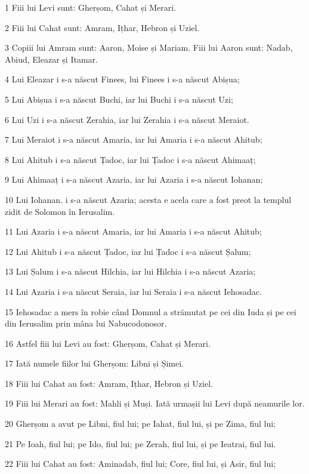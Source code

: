 \par 1 Fiii lui Levi sunt: Gherșom, Cahat și Merari.
\par 2 Fiii lui Cahat sunt: Amram, Ițhar, Hebron și Uziel.
\par 3 Copiii lui Amram sunt: Aaron, Moise și Mariam. Fiii lui Aaron sunt: Nadab, Abiud, Eleazar și Itamar.
\par 4 Lui Eleazar i s-a născut Finees, lui Finees i s-a născut Abișua;
\par 5 Lui Abișua i s-a născut Buchi, iar lui Buchi i s-a născut Uzi;
\par 6 Lui Uzi i s-a născut Zerahia, iar lui Zerahia i s-a născut Meraiot.
\par 7 Lui Meraiot i s-a născut Amaria, iar lui Amaria i s-a născut Ahitub;
\par 8 Lui Ahitub i s-a născut Țadoc, iar lui Țadoc i s-a născut Ahimaaț;
\par 9 Lui Ahimaaț i s-a născut Azaria, iar lui Azaria i s-a născut Iohanan;
\par 10 Lui Iohanan. i s-a născut Azaria; acesta e acela care a fost preot la templul zidit de Solomon în Ierusalim.
\par 11 Lui Azaria i s-a născut Amaria, iar lui Amaria i s-a născut Ahitub;
\par 12 Lui Ahitub i s-a născut Țadoc, iar lui Țadoc i s-a născut Șalum;
\par 13 Lui Șalum i s-a născut Hilchia, iar lui Hilchia i s-a născut Azaria;
\par 14 Lui Azaria i s-a născut Seraia, iar lui Seraia i s-a născut Iehosadac.
\par 15 Iehosadac a mers în robie când Domnul a strămutat pe cei din Iuda și pe cei din Ierusalim prin mâna lui Nabucodonosor.
\par 16 Astfel fiii lui Levi au fost: Gherșom, Cahat și Merari.
\par 17 Iată numele fiilor lui Gherșom: Libni și Șimei.
\par 18 Fiii lui Cahat au fost: Amram, Ițhar, Hebron și Uziel.
\par 19 Fiii lui Merari au fost: Mahli și Muși. Iată urmașii lui Levi după neamurile lor.
\par 20 Gherșom a avut pe Libni, fiul lui; pe Iahat, fiul lui, și pe Zima, fiul lui;
\par 21 Pe Ioah, fiul lui; pe Ido, fiul lui; pe Zerah, fiul lui, și pe Ieatrai, fiul lui.
\par 22 Fiii lui Cahat au fost: Aminadab, fiul lui; Core, fiul lui, și Asir, fiul lui;
